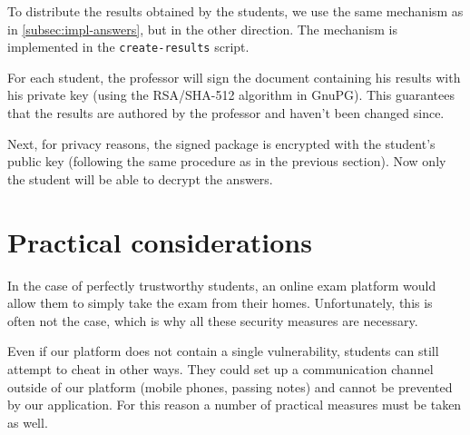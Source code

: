 \documentclass[12pt]{article}
\begin{document}
To distribute the results obtained by the students, we use the same mechanism as
in \autoref{subsec:impl-answers}, but in the other direction. The mechanism is
implemented in the \texttt{create-results} script.


For each student, the professor will sign the document containing his results
with his private key (using the RSA/SHA-512 algorithm in GnuPG). This guarantees
that the results are authored by the professor and haven't been changed since.

Next, for privacy reasons, the signed package is encrypted with the student's
public key (following the same procedure as in the previous section). Now only
the student will be able to decrypt the answers.



\section{Practical considerations}
\label{sec:practical}

In the case of perfectly trustworthy students, an online exam platform would
allow them to simply take the exam from their homes. Unfortunately, this is
often not the case, which is why all these security measures are necessary.

Even if our platform does not contain a single vulnerability, students can still
attempt to cheat in other ways. They could set up a communication channel
outside of our platform (mobile phones, passing notes) and cannot be prevented
by our application. For this reason a number of practical measures must be taken
as well.
\end{document}
